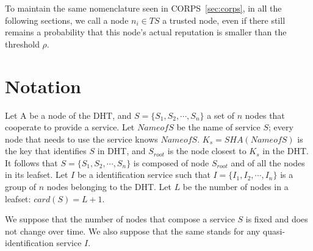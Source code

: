 To maintain the same nomenclature seen in CORPS~\ref{sec:corps}, in all the following sections,
we call a node $n_i \in TS$ a trusted node, even if there still remains a
probability that this node's actual reputation is smaller than the threshold
$\rho$.


\section{Notation}

Let A be a node of the DHT, and $S = \{S_1, S_2, \cdots, S_n\}$ a set of $n$
nodes that cooperate to provide a service. Let $NameofS$ be the name of service
$S$; every node that needs to use the service knows $NameofS$. $K_s =
SHA(NameofS)$ is the key that identifies $S$ in DHT, and $S_{root}$ is the node
closest to $K_s$ in the DHT. It follows that $S = \{S_1, S_2, \cdots, S_n\}$ is
composed of node $S_{root}$ and of all the nodes in its leafset. Let $I$ be a
identification service such that $I = \{ I_1, I_2, \cdots, I_n\}$ is a group of
$n$ nodes belonging to the DHT. Let $L$ be the number of nodes in a
leafset: $card(S) = L + 1$.



We suppose that the number of nodes that compose a service $S$ is fixed and does
not change over time. We also suppose that the same stands for any
quasi-identification service $I$.
